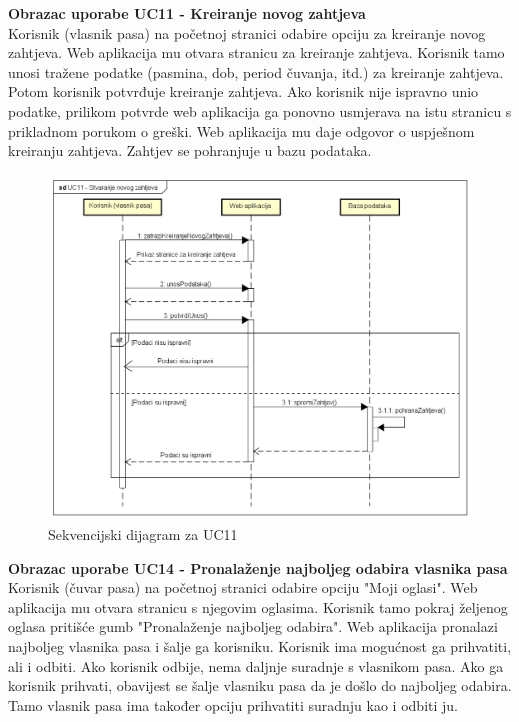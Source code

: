 				\textbf{Obrazac uporabe UC11 - Kreiranje novog zahtjeva}\\
				
				Korisnik (vlasnik pasa) na početnoj stranici odabire opciju za kreiranje novog zahtjeva. Web aplikacija mu otvara stranicu za kreiranje zahtjeva. Korisnik tamo unosi tražene podatke (pasmina, dob, period čuvanja, itd.) za kreiranje zahtjeva. Potom korisnik potvrđuje kreiranje zahtjeva. Ako korisnik nije ispravno unio podatke, prilikom potvrde web aplikacija ga ponovno usmjerava na istu stranicu s prikladnom porukom o greški. Web aplikacija mu daje odgovor o uspješnom kreiranju zahtjeva. Zahtjev se pohranjuje u bazu podataka.
				
				\begin{figure}[htb]
					\centering
					\includegraphics[width=16cm]{slike/UC11 - Stvaranje novog zahtjeva - sekvencijski - v3}
					\caption{Sekvencijski dijagram za UC11}
					\label{fig:Sekvencijski-UC11}
				\end{figure}
				\eject		
				
				\textbf{Obrazac uporabe UC14 - Pronalaženje najboljeg odabira vlasnika pasa}\\
				
				Korisnik (čuvar pasa) na početnoj stranici odabire opciju "Moji oglasi". Web aplikacija mu otvara stranicu s njegovim oglasima. Korisnik tamo pokraj željenog oglasa pritišće gumb "Pronalaženje najboljeg odabira". Web aplikacija pronalazi najboljeg vlasnika pasa i šalje ga korisniku. Korisnik ima mogućnost ga prihvatiti, ali i odbiti. Ako korisnik odbije, nema daljnje suradnje s vlasnikom pasa. Ako ga korisnik prihvati, obavijest se šalje vlasniku pasa da je došlo do najboljeg odabira. Tamo vlasnik pasa ima također opciju prihvatiti suradnju kao i odbiti ju.
				
